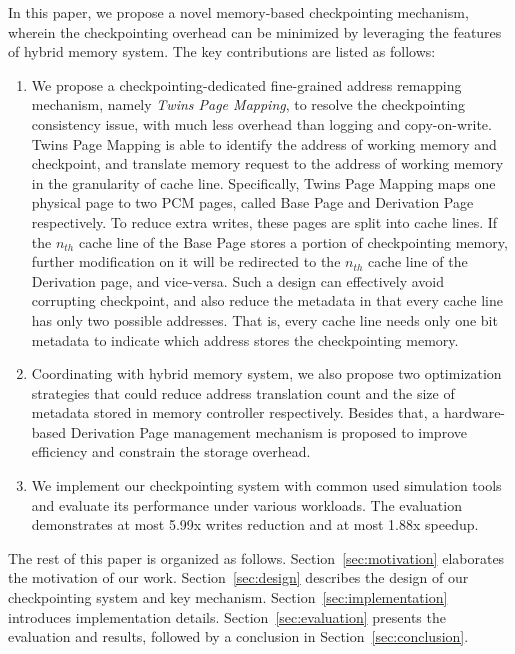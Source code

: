 \documentclass[conference]{IEEEtran}
\begin{document}
In this paper, we propose a novel memory-based checkpointing mechanism, wherein the checkpointing overhead can be minimized by leveraging the features of hybrid memory system.
The key contributions are listed as follows:

\begin{enumerate}
    \item We propose a checkpointing-dedicated fine-grained address remapping mechanism, namely \emph{Twins Page Mapping}, to resolve the checkpointing consistency issue, with much less overhead than logging and copy-on-write.
        Twins Page Mapping is able to identify the address of working memory and checkpoint, and translate memory request to the address of working memory in the granularity of cache line.
        Specifically, Twins Page Mapping maps one physical page to two PCM pages, called Base Page and Derivation Page respectively.
        To reduce extra writes, these pages are split into cache lines.
        If the $n_{th}$ cache line of the Base Page stores a portion of checkpointing memory, further modification on it will be redirected to the $n_{th}$ cache line of the Derivation page, and vice-versa.
        Such a design can effectively avoid corrupting checkpoint, and also reduce the metadata in that every cache line has only two possible addresses.
        That is, every cache line needs only one bit metadata to indicate which address stores the checkpointing memory.
    \item Coordinating with hybrid memory system, we also propose two optimization strategies that could reduce address translation count and the size of metadata stored in memory controller respectively.
        Besides that, a hardware-based Derivation Page management mechanism is proposed to improve efficiency and constrain the storage overhead.
    \item We implement our checkpointing system with common used simulation tools and evaluate its performance under various workloads.
        The evaluation demonstrates at most 5.99x writes reduction and at most 1.88x speedup.
\end{enumerate}

The rest of this paper is organized as follows.
Section~\ref{sec:motivation} elaborates the motivation of our work.
Section~\ref{sec:design} describes the design of our checkpointing system and key mechanism.
Section~\ref{sec:implementation} introduces implementation details.
Section~\ref{sec:evaluation} presents the evaluation and results, followed by a conclusion in Section~\ref{sec:conclusion}.
\end{document}

